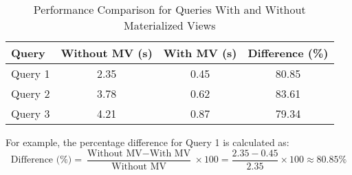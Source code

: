 \begin{table}[h!]
    \centering
    \begin{tabular}{@{}lccc@{}}
        \toprule
        \textbf{Query} & \textbf{Without MV (s)} & \textbf{With MV (s)} & \textbf{Difference (\%)} \\ \midrule
        Query 1        & 2.35                   & 0.45                 & 80.85                   \\
        Query 2        & 3.78                   & 0.62                 & 83.61                   \\
        Query 3        & 4.21                   & 0.87                 & 79.34                   \\ \bottomrule
    \end{tabular}
    \caption{Performance Comparison for Queries With and Without Materialized Views}
    \label{tab:performance}
\end{table}

For example, the percentage difference for Query 1 is calculated as:
\[
\text{Difference (\%)} = \frac{\text{Without MV} - \text{With MV}}{\text{Without MV}} \times 100 = \frac{2.35 - 0.45}{2.35} \times 100 \approx 80.85\%
\]